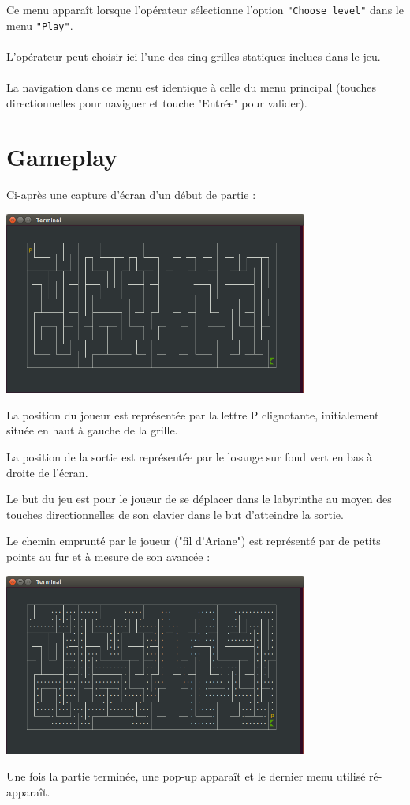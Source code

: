 Ce menu apparaît lorsque l'opérateur sélectionne l'option \verb|"Choose level"| dans le menu \verb|"Play"|.

\paragraph{}L'opérateur peut choisir ici l'une des cinq grilles statiques inclues dans le jeu.

\paragraph{}La navigation dans ce menu est identique à celle du menu principal (touches directionnelles pour naviguer et touche "Entrée" pour valider).

\section{Gameplay}

Ci-après une capture d'écran d'un début de partie :
\begin{center}
	\includegraphics[width=0.75\textwidth]{annexe-manuel_utilisateur/rsrc/Labyrinthe-Debut.png}
\end{center}

La position du joueur est représentée par la lettre P clignotante, initialement située en haut à gauche de la grille.

La position de la sortie est représentée par le losange sur fond vert en bas à droite de l'écran.

Le but du jeu est pour le joueur de se déplacer dans le labyrinthe au moyen des touches directionnelles de son clavier dans le but d'atteindre la sortie.

Le chemin emprunté par le joueur ("fil d'Ariane") est représenté par de petits points au fur et à mesure de son avancée :
\begin{center}
	\includegraphics[width=0.75\textwidth]{annexe-manuel_utilisateur/rsrc/Labyrinthe-fin.png}
\end{center}

Une fois la partie terminée, une pop-up apparaît et le dernier menu utilisé ré-apparaît.